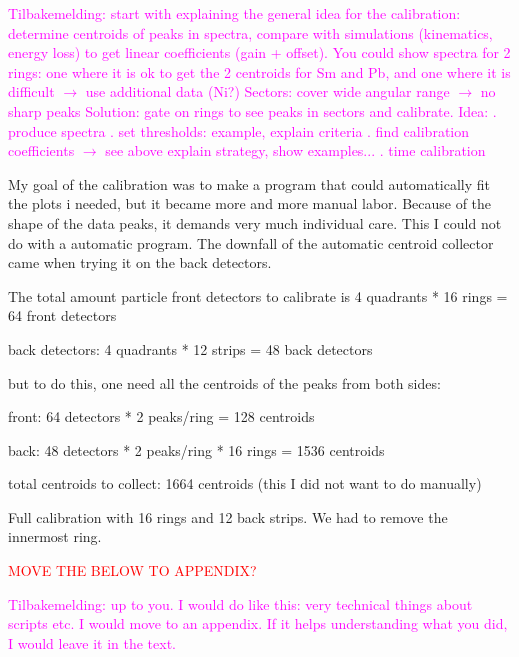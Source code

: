 \documentclass[twoside,english]{uiofysmaster/uiofysmaster}
\begin{document}
\textcolor{Magenta}{Tilbakemelding: \newline 
start with explaining the general idea for the calibration: \newline 
determine centroids of peaks in spectra, compare with simulations (kinematics, energy loss) to get linear coefficients (gain + offset). You could show spectra for 2 rings: one where it is ok to get the 2 centroids for Sm and Pb, and one where it is difficult $\rightarrow$ use additional data (Ni?) \newline
Sectors: cover wide angular range $\rightarrow$ no sharp peaks  \newline
Solution: gate on rings to see peaks in sectors and calibrate. \newline
Idea: . produce spectra . set thresholds: example, explain criteria . find calibration coefficients $\rightarrow$ see above \newline
explain strategy, show examples... . time calibration 
}


My goal of the calibration was to make a program that could automatically fit the plots i needed, but it became more and more manual labor. 
Because of the shape of the data peaks, it demands very much individual care. 
This I could not do with a automatic program. 
The downfall of the automatic centroid collector came when trying it on the back detectors. 

The total amount particle front detectors to calibrate is 4 quadrants * 16 rings = 64 front detectors 

back detectors: 4 quadrants * 12 strips = 48 back detectors


but to do this, one need all the centroids of the peaks from both sides:

front: 64 detectors * 2 peaks/ring = 128 centroids

back: 48 detectors * 2 peaks/ring * 16 rings =  1536 centroids 

total centroids to collect: 1664 centroids (this I did not want to do manually)

Full calibration with 16 rings and 12 back strips. We had to remove the innermost ring. 



\textcolor{red}{MOVE THE BELOW TO APPENDIX?}

\textcolor{Magenta}{Tilbakemelding: \newline 
up to you. I would do like this: \newline
very technical things about scripts etc. I would move to an appendix. If it helps understanding what you did, I would leave it in the text.
}
\end{document}

